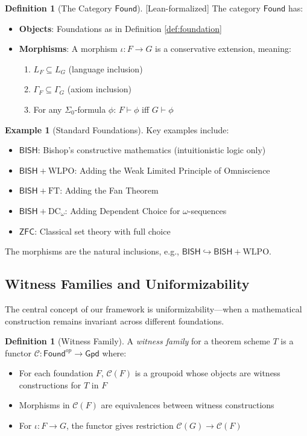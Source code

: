 \documentclass[11pt]{article}
\theoremstyle{plain}
\theoremstyle{definition}
\newtheorem{definition}[theorem]{Definition}
\newtheorem{example}[theorem]{Example}
\newcommand{\WLPO}{\mathrm{WLPO}}
\newcommand{\FT}{\mathrm{FT}}
\newcommand{\DCw}{\mathrm{DC}_\omega}
\newcommand{\BISH}{\mathsf{BISH}}
\newcommand{\ZFC}{\mathsf{ZFC}}
\newcommand{\Found}{\mathsf{Found}}
\newcommand{\Gpd}{\mathsf{Gpd}}
\newcommand{\SigmaZero}{\Sigma_{0}}
\newcommand{\leanok}{\textsf{\textcolor{green!70!black}{[Lean-formalized]}}}
\begin{document}
\begin{definition}[The Category $\Found$] \leanok
The category $\Found$ has:
\begin{itemize}
\item \textbf{Objects}: Foundations as in Definition \ref{def:foundation}
\item \textbf{Morphisms}: A morphism $\iota: F \to G$ is a conservative extension, meaning:
  \begin{enumerate}
  \item $L_F \subseteq L_G$ (language inclusion)
  \item $\Gamma_F \subseteq \Gamma_G$ (axiom inclusion)
  \item For any $\SigmaZero$-formula $\phi$: $F \vdash \phi$ iff $G \vdash \phi$
  \end{enumerate}
\end{itemize}
\end{definition}

\begin{example}[Standard Foundations]
Key examples include:
\begin{itemize}
\item $\BISH$: Bishop's constructive mathematics (intuitionistic logic only)
\item $\BISH + \WLPO$: Adding the Weak Limited Principle of Omniscience
\item $\BISH + \FT$: Adding the Fan Theorem
\item $\BISH + \DCw$: Adding Dependent Choice for $\omega$-sequences
\item $\ZFC$: Classical set theory with full choice
\end{itemize}
The morphisms are the natural inclusions, e.g., $\BISH \hookrightarrow \BISH + \WLPO$.
\end{example}

\subsection{Witness Families and Uniformizability}

The central concept of our framework is uniformizability—when a mathematical construction remains invariant across different foundations.

\begin{definition}[Witness Family]\label{def:witness-family}
A \emph{witness family} for a theorem scheme $T$ is a functor $\mathcal{C}: \Found^{op} \to \Gpd$ where:
\begin{itemize}
\item For each foundation $F$, $\mathcal{C}(F)$ is a groupoid whose objects are witness constructions for $T$ in $F$
\item Morphisms in $\mathcal{C}(F)$ are equivalences between witness constructions
\item For $\iota: F \to G$, the functor gives restriction $\mathcal{C}(G) \to \mathcal{C}(F)$
\end{itemize}
\end{definition}
\end{document}
